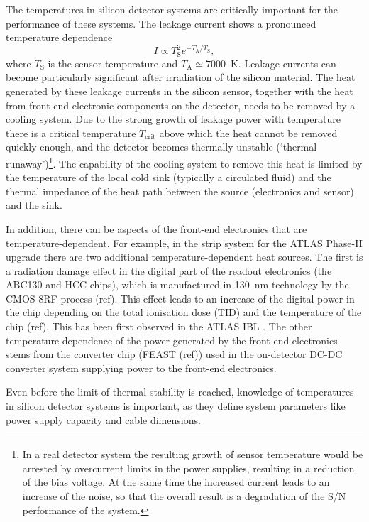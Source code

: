 The temperatures in silicon detector systems are critically important for the performance of these systems. The leakage current shows a pronounced temperature dependence 
\begin{equation}
I\propto T_\text{S}^2e^{-T_\text{A}/T_\text{S}},
\label{eq:leakage_current_temp_dependence}
\end{equation}
where $T_\text{S}$ is the sensor temperature and $T_\text{A}\simeq7000$~K. Leakage currents can become particularly significant after irradiation of the silicon material. The heat generated by these leakage currents in the silicon sensor, together with the heat from front-end electronic components on the detector, needs to be removed by a cooling system. Due to the strong growth of leakage power with temperature there is a critical temperature $T_\text{crit}$ above which the heat cannot be removed quickly enough, and the detector becomes thermally unstable (`thermal runaway')\footnote{In a real detector system the resulting growth of sensor temperature would be arrested by overcurrent limits in the power supplies, resulting in a reduction of the bias voltage. At the same time the increased current leads to an increase of the noise, so that the overall result is a degradation of the S/N performance of the system.}. The capability of the cooling system to remove this heat is limited by the temperature of the local cold sink (typically a circulated fluid) and the thermal impedance of the heat path between the source (electronics and sensor) and the sink.

In addition, there can be aspects of the front-end electronics that are temperature-dependent. For example, in the strip system for the ATLAS Phase-II upgrade \cite{Collaboration:2017mtb} there are two additional temperature-dependent heat sources. The first is a radiation damage effect in the digital part of the readout electronics (the ABC130 and HCC chips), which is manufactured in 130~nm technology by the CMOS 8RF process (ref). This effect leads to an increase of the digital power in the chip depending on the total ionisation dose (TID) and the temperature of the chip (ref). This has been first observed in the ATLAS IBL \cite{ATL-INDET-PUB-2017-001}. The other temperature dependence of the power generated by the front-end electronics stems from the converter chip (FEAST (ref)) used in the on-detector DC-DC converter system supplying power to the front-end electronics. 

Even before the limit of thermal stability is reached, knowledge of temperatures in silicon detector systems is important, as they define system parameters like power supply capacity and cable dimensions.

